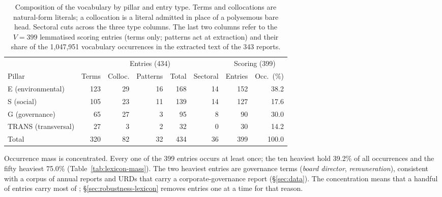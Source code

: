 \begin{table}[tbp]
\centering
\caption{Composition of the vocabulary by pillar and entry type. Terms and
collocations are natural-form literals; a collocation is a literal admitted in
place of a polysemous bare head. Sectoral cuts across the three type columns.
The last two columns refer to the $V = 399$ lemmatised scoring entries (terms
only; patterns act at extraction) and their share of the 1,047,951 vocabulary
occurrences in the extracted text of the 343 reports.}
\label{tab:lexicon-blocks}
\begin{tabular}{lrrrrrrr}
\toprule
 & \multicolumn{5}{c}{Entries (434)} & \multicolumn{2}{c}{Scoring (399)} \\
\cmidrule(lr){2-6}\cmidrule(lr){7-8}
Pillar & Terms & Colloc. & Patterns & Total & Sectoral & Entries & Occ.\ (\%) \\
\midrule
E (environmental) & 123 & 29 & 16 & 168 & 14 & 152 & 38.2 \\
S (social) & 105 & 23 & 11 & 139 & 14 & 127 & 17.6 \\
G (governance) & 65 & 27 & 3 & 95 & 8 & 90 & 30.0 \\
TRANS (transversal) & 27 & 3 & 2 & 32 & 0 & 30 & 14.2 \\
\midrule
Total & 320 & 82 & 32 & 434 & 36 & 399 & 100.0 \\
\bottomrule
\end{tabular}
\end{table}

Occurrence mass is concentrated. Every one of the 399 entries occurs at least
once; the ten heaviest hold 39.2\% of all occurrences and the fifty heaviest
75.0\% (Table~\ref{tab:lexicon-mass}). The two heaviest entries are
governance terms (\emph{board director}, \emph{remuneration}), consistent with
a corpus of annual reports and URDs that carry a corporate-governance report
(\S\ref{sec:data}). The concentration means that a handful of entries carry
most of \SUS; \S\ref{sec:robustness-lexicon} removes entries one at a time for
that reason.

